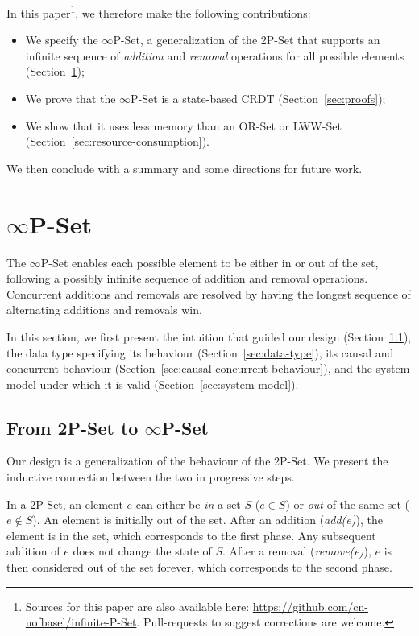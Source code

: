 \documentclass[11pt, oneside]{article}   	%
\begin{document}
In this paper\footnote{Sources for this paper are also available here: \url{https://github.com/cn-uofbasel/infinite-P-Set}. Pull-requests to suggest corrections are welcome.}, we therefore make the following contributions:
\begin{itemize}
	\item We specify the $\infty$P-Set, a generalization of the 2P-Set that supports an infinite sequence of \textit{addition} and \textit{removal} operations for all possible elements (Section~\ref{sec:specification});
	\item We prove that the $\infty$P-Set is a state-based CRDT (Section~\ref{sec:proofs});
	\item We show that it uses less memory than an OR-Set or LWW-Set (Section~\ref{sec:resource-consumption}).
\end{itemize}

We then conclude with a summary and some directions for future work.

\section{$\infty$P-Set}
\label{sec:specification}

The $\infty$P-Set enables each possible element to be either in or out of the set, following a possibly infinite sequence of addition and removal operations. Concurrent additions and removals are resolved by having the longest sequence of alternating additions and removals win. 

In this section, we first present the intuition that guided our design (Section~\ref{sec:intuition}), the data type specifying its behaviour (Section~\ref{sec:data-type}), its causal and concurrent behaviour (Section~\ref{sec:causal-concurrent-behaviour}), and the system model under which it is valid (Section~\ref{sec:system-model}).

\subsection{From 2P-Set to $\infty$P-Set}
\label{sec:intuition}

Our design is a generalization of the behaviour of the 2P-Set. We present the inductive connection between the two in progressive steps. 

In a 2P-Set, an element $e$ can either be \textit{in} a set $S$ ($e \in S$) or \textit{out} of the same set ($e \notin S$). An element is initially out of the set. After an addition (\textit{add(e)}), the element is in the set, which corresponds to the first phase. Any subsequent addition of $e$ does not change the state of $S$. After a removal (\textit{remove(e)}), $e$ is then considered out of the set forever, which corresponds to the second phase.
\end{document}

